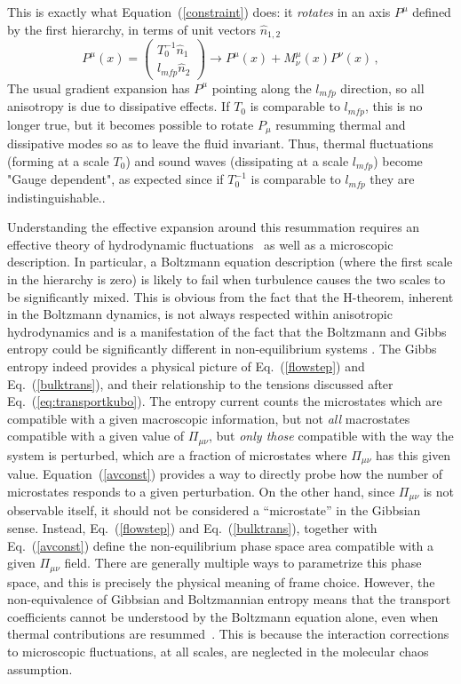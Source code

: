 \documentclass[12pt,onecolumn,showpacs,amssymb,aps,nofootinbib,floatfix]{revtex4-2}
\renewcommand{\eqref}[1]{Eq.~(\ref{#1})}
\begin{document}
        This is exactly what
        Equation~(\ref{constraint}) does: it {\em rotates} in an axis $P^\mu$ defined by the first hierarchy, in terms of unit vectors $\hat{n}_{1,2}$
	\begin{equation}
		\label{hyerarchym}
		P^\mu(x) = \left(\begin{array}{c} T_0^{-1} \hat{n}_1 \\
			l_{mfp} \hat{n}_2\end{array} \right)
		\rightarrow P^\mu(x) +M_{\nu}^\mu(x)P^\nu(x)\,,
	\end{equation}
The usual gradient expansion has $P^\mu$ pointing along the $l_{mfp}$ direction, so all anisotropy is due to dissipative effects.  If $T_0$ is comparable to $l_{mfp}$, this is no longer true, but it becomes possible to
rotate $P_\mu$	resumming thermal and dissipative modes so as to leave the fluid invariant.
Thus, thermal fluctuations (forming at a scale $T_0$) and sound waves (dissipating at a scale $l_{mfp}$) become "Gauge dependent", as expected since if $T_0^{-1}$ is comparable to $l_{mfp}$ they are indistinguishable.\color{black}.

	Understanding the effective expansion around this resummation requires
	an effective theory of hydrodynamic fluctuations~\cite{stick,kovfluct,hnatic} as well as a microscopic description.  In particular, a Boltzmann equation description (where the first scale in the hierarchy is zero) is likely to fail when turbulence causes the two scales to be significantly mixed.  This is obvious from the fact that the H-theorem, inherent in the Boltzmann dynamics, is not always respected within anisotropic hydrodynamics and is a manifestation of the fact that the Boltzmann and Gibbs entropy could be significantly different in non-equilibrium systems \cite{jaynes}.     The Gibbs entropy  indeed provides a physical picture of \eqref{flowstep} and \eqref{bulktrans}, and their relationship to the tensions discussed after \eqref{eq:transportkubo}.  The entropy current counts the microstates which are compatible with a given macroscopic information, but not {\em all} macrostates compatible with a given value of $\Pi_{\mu \nu}$, but {\em only those} compatible with the way the system is perturbed, which are a fraction of microstates where $\Pi_{\mu \nu}$ has this given value. Equation~(\ref{avconst}) provides a way to directly probe how the number of microstates responds to a given perturbation.
	On the other hand, since $\Pi_{\mu \nu}$ is not observable itself, it should not be considered a ``microstate'' in the Gibbsian sense.  Instead, \eqref{flowstep} and \eqref{bulktrans}, together with \eqref{avconst} define the non-equilibrium phase space area compatible with a given $\Pi_{\mu \nu}$ field. There are generally multiple ways to parametrize this phase space, and this is precisely the physical meaning of frame choice.
	However, the non-equivalence of Gibbsian and Boltzmannian entropy means that the transport coefficients cannot be understood by the Boltzmann equation alone, even when thermal contributions are resummed~\cite{arnold}.
	This is because the interaction corrections to microscopic fluctuations, at all scales, are neglected in the molecular chaos assumption.
 
\end{document}

